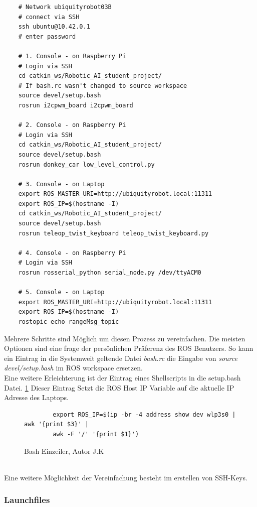 \documentclass[conference]{IEEEtran}
\begin{document}
	\begin{verbatim}
	# Network ubiquityrobot03B
	# connect via SSH
	ssh ubuntu@10.42.0.1
	# enter password
	
	# 1. Console - on Raspberry Pi
	# Login via SSH
	cd catkin_ws/Robotic_AI_student_project/
	# If bash.rc wasn't changed to source workspace
	source devel/setup.bash
	rosrun i2cpwm_board i2cpwm_board
	
	# 2. Console - on Raspberry Pi
	# Login via SSH
	cd catkin_ws/Robotic_AI_student_project/
	source devel/setup.bash
	rosrun donkey_car low_level_control.py
	
	# 3. Console - on Laptop 
	export ROS_MASTER_URI=http://ubiquityrobot.local:11311
	export ROS_IP=$(hostname -I)
	cd catkin_ws/Robotic_AI_student_project/
	source devel/setup.bash
	rosrun teleop_twist_keyboard teleop_twist_keyboard.py
	
	# 4. Console - on Raspberry Pi
	# Login via SSH
	rosrun rosserial_python serial_node.py /dev/ttyACM0
	
	# 5. Console - on Laptop
	export ROS_MASTER_URI=http://ubiquityrobot.local:11311
	export ROS_IP=$(hostname -I)
	rostopic echo rangeMsg_topic
	\end{verbatim}
	
	Mehrere Schritte sind Möglich um diesen Prozess zu vereinfachen. Die 
	meisten Optionen sind eine frage der persönlichen Präferenz des ROS 
	Benutzers.  So kann ein Eintrag in die Systemweit geltende Datei 
	\textit{bash.rc} die Eingabe von \textit{source devel/setup.bash} im ROS 
	workspace ersetzen. \\
	Eine weitere Erleichterung ist der Eintrag eines Shellscripts in die 
	setup.bash Datei. \ref{Einzeiler} Dieser Eintrag Setzt die ROS Host IP 
	Variable auf die aktuelle IP Adresse des Laptops.
	\begin{figure}
		\centering
		\begin{verbatim}
		export ROS_IP=$(ip -br -4 address show dev wlp3s0 | awk '{print $3}' | 
		awk -F '/' '{print $1}')
		\end{verbatim}
		\label{Einzeiler}
		\caption{Bash Einzeiler, Autor J.K }
	\end{figure}
	\\
	Eine weitere Möglichkeit der Vereinfachung besteht im erstellen von 
	SSH-Keys. 
	
	\subsubsection{Launchfiles}
	
\end{document}
